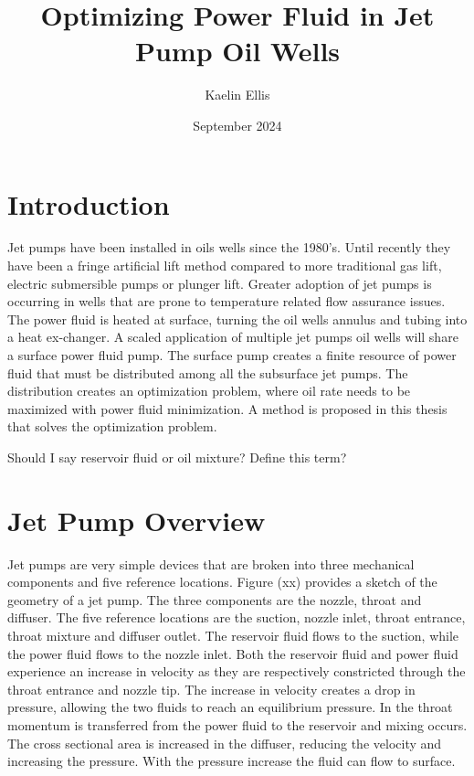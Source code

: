 \documentclass{article}
\title{Optimizing Power Fluid in Jet Pump Oil Wells}
\author{Kaelin Ellis}
\date{September 2024}
\begin{document}
\maketitle

\section{Introduction}

Jet pumps have been installed in oils wells since the 1980's. Until recently they have been a fringe artificial lift method compared to more traditional gas lift, electric submersible pumps or plunger lift. Greater adoption of jet pumps is occurring in wells that are prone to temperature related flow assurance issues. The power fluid is heated at surface, turning the oil wells annulus and tubing into a heat ex-changer. A scaled application of multiple jet pumps oil wells will share a surface power fluid pump. The surface pump creates a finite resource of power fluid that must be distributed among all the subsurface jet pumps. The distribution creates an optimization problem, where oil rate needs to be maximized with power fluid minimization. A method is proposed in this thesis that solves the optimization problem.

Should I say reservoir fluid or oil mixture? Define this term?

\section{Jet Pump Overview}

Jet pumps are very simple devices that are broken into three mechanical components and five reference locations. Figure (xx) provides a sketch of the geometry of a jet pump. The three components are the nozzle, throat and diffuser. The five reference locations are the suction, nozzle inlet, throat entrance, throat mixture and diffuser outlet. The reservoir fluid flows to the suction, while the power fluid flows to the nozzle inlet. Both the reservoir fluid and power fluid experience an increase in velocity as they are respectively constricted through the throat entrance and nozzle tip. The increase in velocity creates a drop in pressure, allowing the two fluids to reach an equilibrium pressure. In the throat momentum is transferred from the power fluid to the reservoir and mixing occurs. The cross sectional area is increased in the diffuser, reducing the velocity and increasing the pressure. With the pressure increase the fluid can flow to surface. 
\end{document}
